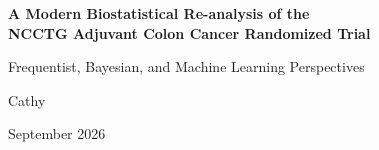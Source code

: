 \documentclass[11pt,a4paper]{article}
\begin{document}
\begin{titlepage}
    \centering
    \vspace*{0.28\textheight}
    {\huge\bfseries A Modern Biostatistical Re-analysis of the\\
     NCCTG Adjuvant Colon Cancer Randomized Trial\par}

    \vspace{1.6em}
    {\Large Frequentist, Bayesian, and Machine Learning Perspectives\par}

    \vspace{5em}
    {\Large Cathy\par}

    \vspace{1.8em}
    {\large September 2026\par}

    \vfill
    \vspace*{2.5cm}
\end{titlepage}

\tableofcontents
\newpage










\end{document}

